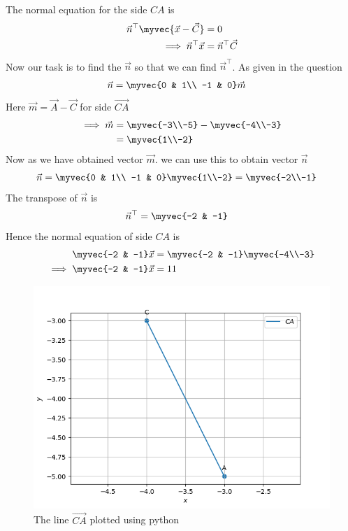 \documentclass[11pt]{book}
\begin{document}
\begin{enumerate}[label=\thesection.\arabic*.,ref=\thesection.\theenumi]
       The normal equation for the side $CA$ is
\begin{align}
\vec{n}^{\top}\myvec{\vec{x}-\vec{C}}&=0\\
\implies
\vec{n}^{\top}\vec{x}&=\vec{n}^{\top}\vec{C}
\end{align}
Now our task is to find the $\vec{n}$ so that we can find $\vec{n}^{\top}$.
As given in the question 
\begin{align}
  \vec{n} &= \myvec{0 & 1\\
  -1 & 0}\vec{m}
\end{align}
Here $\vec{m} = \vec{A}- \vec{C}$ for side $\vec{CA}$
\begin{align}
\implies
\vec{m}&=\myvec{-3\\-5} - \myvec{-4\\-3}\\
&=\myvec{1\\-2}
\end{align}
Now as we have obtained vector $\vec{m}$.
we can use this to obtain vector $\vec{n}$
\begin{align}
\vec{n} &= \myvec{0 & 1\\
  -1 & 0}\myvec{1\\-2}
 = \myvec{-2\\-1}
\end{align}
The transpose of $\vec{n}$ is
\begin{align}
  \vec{n}^{\top}&=\myvec{-2 & -1}
\end{align}
Hence the normal equation of side $CA$ is 
\begin{align}
    \myvec{-2 & -1}\vec{x}&=\myvec{-2 & -1}\myvec{-4\\-3}\\
    \implies
    \myvec{-2 & -1}\vec{x}&=11
\end{align}
\begin{figure}
\includegraphics [width=\columnwidth] {figs/lineca.png}
\caption{ The line $\vec{CA}$ plotted using python}
\label{fig: lineca}
\end{figure}



\end{enumerate}
\end{document}
